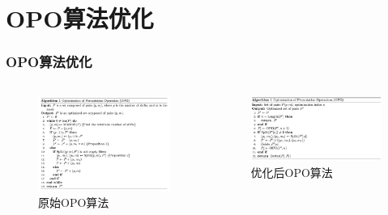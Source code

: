 \documentclass{beamer}
\begin{document}
\section{OPO算法优化}
\begin{frame}
    \frametitle{OPO算法优化}
    \begin{columns}
        \begin{figure}
            \includegraphics[width=\textwidth]{./fig/old_opo.png}
            \caption{原始OPO算法}
        \end{figure}
        
        \begin{figure}
            \includegraphics[width=\textwidth]{./fig/new_opo.png}
            \caption{优化后OPO算法}
        \end{figure}
    \end{columns}
\end{frame}
\end{document}
